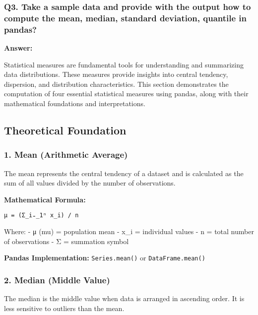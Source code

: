 \documentclass[11pt]{article}
\begin{document}
    \subsubsection{Q3. Take a sample data and provide with the output how to
compute the mean, median, standard deviation, quantile in
pandas?}\label{q3.-take-a-sample-data-and-provide-with-the-output-how-to-compute-the-mean-median-standard-deviation-quantile-in-pandas}

\textbf{Answer:}

Statistical measures are fundamental tools for understanding and
summarizing data distributions. These measures provide insights into
central tendency, dispersion, and distribution characteristics. This
section demonstrates the computation of four essential statistical
measures using pandas, along with their mathematical foundations and
interpretations.

\subsection{Theoretical Foundation}\label{theoretical-foundation}

\subsubsection{\texorpdfstring{1. \textbf{Mean (Arithmetic
Average)}}{1. Mean (Arithmetic Average)}}\label{mean-arithmetic-average}

The mean represents the central tendency of a dataset and is calculated
as the sum of all values divided by the number of observations.

\textbf{Mathematical Formula:}

\begin{verbatim}
μ = (Σ_i₌_1ⁿ x_i) / n
\end{verbatim}

Where: - μ (mu) = population mean - x\_i = individual values - n = total
number of observations - Σ = summation symbol

\textbf{Pandas Implementation:} \texttt{Series.mean()} or
\texttt{DataFrame.mean()}

\subsubsection{\texorpdfstring{2. \textbf{Median (Middle
Value)}}{2. Median (Middle Value)}}\label{median-middle-value}

The median is the middle value when data is arranged in ascending order.
It is less sensitive to outliers than the mean.
\end{document}
